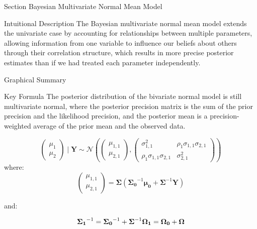 
\begin{frame}{Section}
\centering
\Huge{Bayesian Multivariate Normal Mean Model}
\end{frame}


\begin{frame}{Intuitional Description}
The Bayesian multivariate normal mean model extends the univariate case by accounting for relationships between multiple parameters, allowing information from one variable to influence our beliefs about others through their correlation structure, which results in more precise posterior estimates than if we had treated each parameter independently.
\end{frame}

\begin{frame}{Graphical Summary}

\end{frame}


\begin{frame}{Key Formula}
The posterior distribution of the bivariate normal model is still multivariate normal, where the posterior precision matrix is the sum of the prior precision and the likelihood precision, and the posterior mean is a precision-weighted average of the prior mean and the observed data.

$$
\begin{pmatrix}
\mu_1 \\
\mu_2
\end{pmatrix}
\mid \mathbf{Y} \sim \mathcal{N}
\left( 
\begin{pmatrix}
\mu_{1,1} \\
\mu_{2,1}
\end{pmatrix},
\begin{pmatrix}
\sigma_{1,1}^2 & \rho_1 \sigma_{1,1} \sigma_{2,1} \\
\rho_1 \sigma_{1,1} \sigma_{2,1} & \sigma_{2,1}^2
\end{pmatrix}
\right)
$$
where:
$$
\begin{pmatrix}
\mu_{1,1} \\
\mu_{2,1}
\end{pmatrix}
= 
\boldsymbol{\Sigma} \left( \boldsymbol{\Sigma_0}^{-1} \boldsymbol{\mu_0} + \boldsymbol{\Sigma}^{-1} \mathbf{Y} \right)
$$

and:

$$
\boldsymbol{\Sigma_1}^{-1} = \boldsymbol{\Sigma_0}^{-1} + \boldsymbol{\Sigma}^{-1} \\
\boldsymbol{\Omega_1} = \boldsymbol{\Omega_0} + \boldsymbol{\Omega}
$$
\end{frame}


